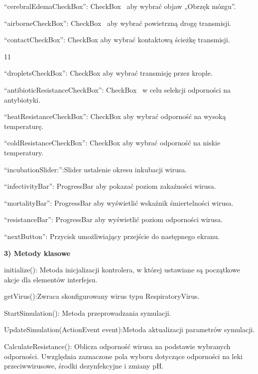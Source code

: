 \documentclass[a4paper]{article}
\begin{document}
\foreignlanguage{polish}{“cerebralEdemaCheckBox”: CheckBox \ aby wybrać objaw „Obrzęk mózgu”.}

\foreignlanguage{polish}{“airborneCheckBox”: CheckBox \ aby wybrać powietrzną drogę transmisji.}

\foreignlanguage{polish}{“contactCheckBox”: CheckBox aby wybrać kontaktową ścieżkę transmisji.}
\begin{center}
	11
\end{center}
\newpage


\foreignlanguage{polish}{“dropletsCheckBox”: CheckBox aby wybrać transmisję przez krople.}

\foreignlanguage{polish}{“antibioticResistanceCheckBox”: CheckBox \ w celu selekcji odporności na antybiotyki.}

\foreignlanguage{polish}{“heatResistanceCheckBox”: CheckBox aby wybrać odporność na wysoką temperaturę.}

\foreignlanguage{polish}{“coldResistanceCheckBox”: CheckBox aby wybrać odporność na niskie temperatury.}

\foreignlanguage{polish}{“incubationSlider:”:Slider ustalenie okresu inkubacji wirusa.}

\foreignlanguage{polish}{“infectivityBar”: ProgressBar aby pokazać poziom zakaźności wirusa.}

\foreignlanguage{polish}{“mortalityBar”: ProgressBar aby wyświetlić wskaźnik śmiertelności wirusa.}

\foreignlanguage{polish}{“resistanceBar”: ProgressBar aby wyświetlić poziom odporności wirusa.}

\foreignlanguage{polish}{“nextButton”: Przycisk umożliwiający przejście do następnego ekranu.}


\bigskip

\foreignlanguage{polish}{\textbf{3) Metody klasowe}}

\foreignlanguage{polish}{initialize(): Metoda inicjalizacji kontrolera, w której ustawiane są początkowe akcje dla
	elementów interfejsu.}
	
	\foreignlanguage{polish}{getVirus():Zwraca skonfigurowany wirus typu RespiratoryVirus.}

\foreignlanguage{polish}{StartSimulation(): Metoda przeprowadzania symulacji.}

\foreignlanguage{polish}{UpdateSimulation(ActionEvent event):Metoda aktualizacji parametrów symulacji.}

\foreignlanguage{polish}{CalculateResistance(): Oblicza odporność wirusa na podstawie wybranych odporności. Uwzględnia zaznaczone pola wyboru dotyczące odporności na leki przeciwwirusowe, środki dezynfekcyjne i zmiany pH.}
\end{document}
